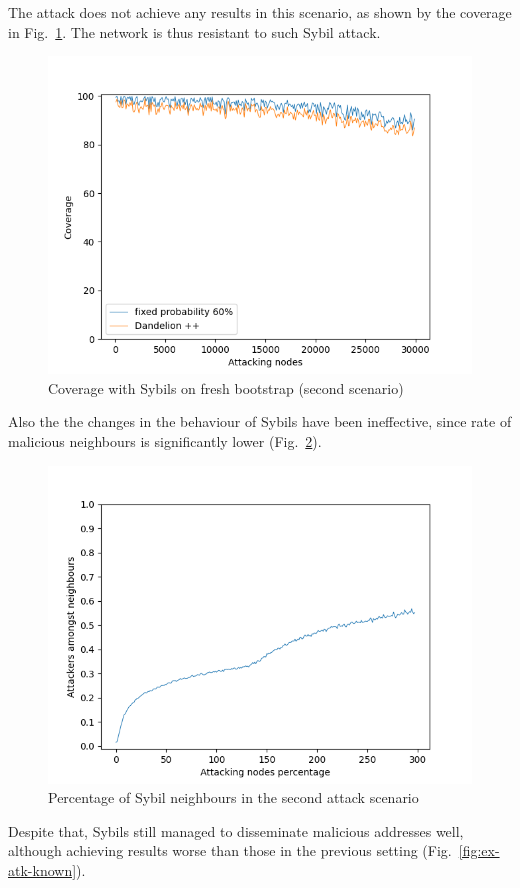The attack does not achieve any results in this scenario, as shown by the coverage in Fig.~\ref{fig:ext-cov}. The network is thus resistant to such Sybil attack.\\

\begin{figure}[h!]
	\includegraphics[width=.7\textwidth]{pict/results/ext-cov.png}
	\centering
	\caption{Coverage with Sybils on fresh bootstrap (second scenario)}
	\label{fig:ext-cov}
\end{figure}



Also the the changes in the behaviour of Sybils have been ineffective, since rate of malicious neighbours is significantly lower (Fig.~\ref{fig:ex-atk-neigh}).\\

\begin{figure}[h!]
	\includegraphics[width=.7\textwidth]{pict/results/ext-hon-atk-neigh.png}
	\centering
	\caption{Percentage of Sybil neighbours in the second attack scenario}
	\label{fig:ex-atk-neigh}
\end{figure}

Despite that, Sybils still managed to disseminate malicious addresses well, although achieving results worse than those in the previous setting (Fig.~\ref{fig:ex-atk-known}).\\

